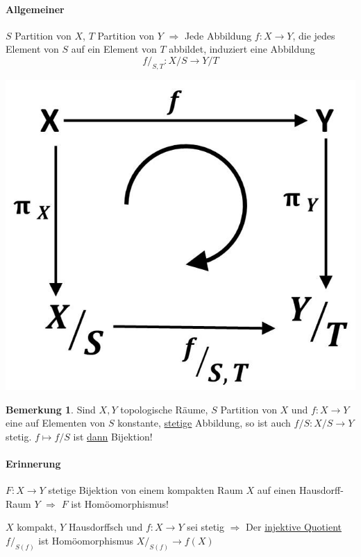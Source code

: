 \documentclass[a4paper,11pt,notitlepage]{report}
\theoremstyle{definition}
\newtheorem{remark}{Bemerkung}[chapter]
\begin{document}
\paragraph{Allgemeiner}
$S$ Partition von $X$, $T$ Partition von $Y$
\newline
$\Rightarrow$ Jede Abbildung $f \colon X \rightarrow Y$, die jedes Element von $S$ auf ein Element von $T$ abbildet, induziert eine Abbildung 
$$f/_{S,T} \colon X/S \rightarrow Y/T$$
\begin{center}
	\includegraphics[scale=0.4]{images/f_modulo_S_T_Diagramm.jpg}
\end{center}

\begin{remark}
	Sind $X,Y$ topologische Räume, $S$ Partition von $X$ und $f \colon X \rightarrow Y$ eine auf Elementen von $S$ konstante, \underline{stetige} Abbildung, so ist auch $f/S \colon X/S \rightarrow Y$ stetig.
	\newline
	$f \mapsto f/S$ ist \underline{dann} Bijektion! 
\end{remark}

\paragraph{Erinnerung}
$F \colon X \rightarrow Y$ stetige Bijektion von einem kompakten Raum $X$ auf einen Hausdorff-Raum $Y$ $\Rightarrow$ $F$ ist Homöomorphismus!

\begin{corollary}
	$X$ kompakt, $Y$ Hausdorffsch und $f \colon X \rightarrow Y$ sei stetig 
	$\Rightarrow$ Der \underline{injektive Quotient} $f/_{S(f)}$ ist Homöomorphismus $X/_{S(f)} \rightarrow f(X)$
\end{corollary}
\end{document}
